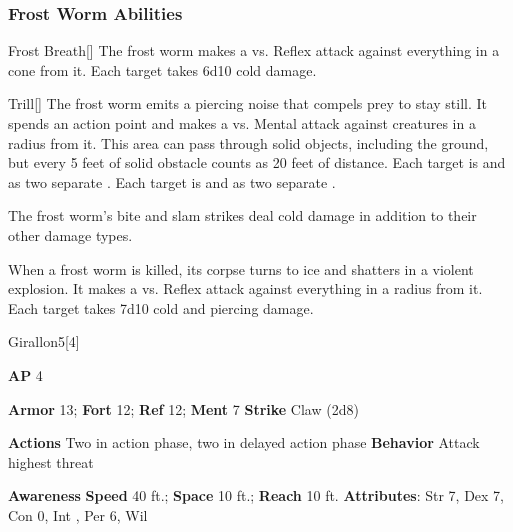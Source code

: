 \subsubsection{Frost Worm Abilities}

\begin{ability}{Frost Breath}[]
The frost worm makes a  vs. Reflex attack against everything in a \arealarge cone from it.
\hit Each target takes 6d10 cold damage.
\end{ability}

\vspace{0.5em}
\begin{ability}{Trill}[]
The frost worm emits a piercing noise that compels prey to stay still.
It spends an action point and makes a  vs. Mental attack against creatures in a \areahuge radius from it.
This area can pass through solid objects, including the ground, but every 5 feet of solid obstacle counts as 20 feet of distance.
\hit Each target is  and  as two separate .
\crit Each target is  and  as two separate .
\end{ability}

The frost worm's bite and slam strikes deal cold damage in addition to their other damage types.

\vspace{0.5em}
When a frost worm is killed, its corpse turns to ice and shatters in a violent explosion.
It makes a  vs. Reflex attack against everything in a \areahuge radius from it.
\hit Each target takes 7d10 cold and piercing damage.





\begin{monsection}{Girallon}{5}[4]
\vspace{-1em}\vspace{-1em}
\begin{spellcontent}
\begin{spelltargetinginfo}
{\textbf{AP} 4}

\pari \textbf{Armor} 13;
\textbf{Fort} 12;
\textbf{Ref} 12;
\textbf{Ment} 7
\pari \textbf{Strike} Claw  (2d8)


\pari \textbf{Actions} Two in action phase, two in delayed action phase
\pari \textbf{Behavior} Attack highest threat
\end{spelltargetinginfo}
\end{spellcontent}

\begin{monsterfooter}
\pari \textbf{Awareness} 
\pari \textbf{Speed} 40 ft.;
\textbf{Space} 10 ft.;
\textbf{Reach} 10 ft.
\pari \textbf{Attributes}:
Str 7,
Dex 7,
Con 0,
Int ,
Per 6,
Wil 
\end{monsterfooter}
\end{monsection}





